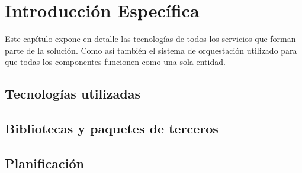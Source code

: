 \chapter{Introducción Específica}
\label{Chapter2}

Este capítulo expone en detalle las tecnologías de todos los servicios que forman parte de la solución. Como así también el sistema de orquestación utilizado para que todas los componentes funcionen como una sola entidad.

	\section{Tecnologías utilizadas}
	
	\section{Bibliotecas y paquetes de terceros}
	
	\section{Planificación}